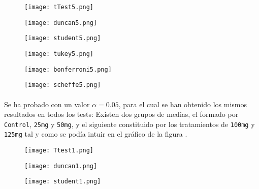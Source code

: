 \documentclass{article}
\begin{document}
      \begin{figure}[H]
        \centering
        \texttt{[image: tTest5.png]}
      \end{figure}
      \begin{figure}[H]
        \centering
        \texttt{[image: duncan5.png]}
      \end{figure}
      \begin{figure}[H]
        \centering
        \texttt{[image: student5.png]}
      \end{figure}

      \begin{figure}[H]
        \centering
        \texttt{[image: tukey5.png]}
      \end{figure}

      \begin{figure}[H]
        \centering
        \texttt{[image: bonferroni5.png]}
      \end{figure}

      \begin{figure}[H]
        \centering
        \texttt{[image: scheffe5.png]}
      \end{figure}

      \paragraph{}
      Se ha probado con un valor $\alpha = 0.05$, para el cual se han obtenido los mismos resultados en todos los tests: Existen dos grupos de medias, el formado por \texttt{Control}, \texttt{25mg} y \texttt{50mg}, y el siguiente constituido por los tratamientos de \texttt{100mg} y \texttt{125mg} tal y como se podía intuir en el gráfico de la figura \label{fig:figura_1}.

      \begin{figure}[H]
        \centering
        \texttt{[image: Ttest1.png]}
      \end{figure}
      \begin{figure}[H]
        \centering
        \texttt{[image: duncan1.png]}
      \end{figure}
      \begin{figure}[H]
        \centering
        \texttt{[image: student1.png]}
      \end{figure}
\end{document}
